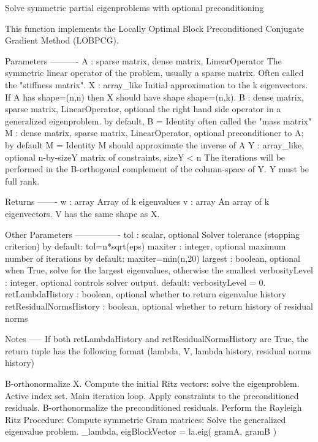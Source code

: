 \begin{DoxyVerb}Solve symmetric partial eigenproblems with optional preconditioning

This function implements the Locally Optimal Block Preconditioned
Conjugate Gradient Method (LOBPCG).

Parameters
----------
A : {sparse matrix, dense matrix, LinearOperator}
    The symmetric linear operator of the problem, usually a
    sparse matrix.  Often called the "stiffness matrix".
X : array_like
    Initial approximation to the k eigenvectors. If A has
    shape=(n,n) then X should have shape shape=(n,k).
B : {dense matrix, sparse matrix, LinearOperator}, optional
    the right hand side operator in a generalized eigenproblem.
    by default, B = Identity
    often called the "mass matrix"
M : {dense matrix, sparse matrix, LinearOperator}, optional
    preconditioner to A; by default M = Identity
    M should approximate the inverse of A
Y : array_like, optional
    n-by-sizeY matrix of constraints, sizeY < n
    The iterations will be performed in the B-orthogonal complement
    of the column-space of Y. Y must be full rank.

Returns
-------
w : array
    Array of k eigenvalues
v : array
    An array of k eigenvectors.  V has the same shape as X.

Other Parameters
----------------
tol : scalar, optional
    Solver tolerance (stopping criterion)
    by default: tol=n*sqrt(eps)
maxiter : integer, optional
    maximum number of iterations
    by default: maxiter=min(n,20)
largest : boolean, optional
    when True, solve for the largest eigenvalues, otherwise the smallest
verbosityLevel : integer, optional
    controls solver output.  default: verbosityLevel = 0.
retLambdaHistory : boolean, optional
    whether to return eigenvalue history
retResidualNormsHistory : boolean, optional
    whether to return history of residual norms


Notes
-----
If both retLambdaHistory and retResidualNormsHistory are True, the
return tuple has the following format
(lambda, V, lambda history, residual norms history)\end{DoxyVerb}
 B-\/orthonormalize X. Compute the initial Ritz vectors\+: solve the eigenproblem. Active index set. Main iteration loop. Apply constraints to the preconditioned residuals. B-\/orthonormalize the preconditioned residuals. Perform the Rayleigh Ritz Procedure\+: Compute symmetric Gram matrices\+: Solve the generalized eigenvalue problem. \+\_\+lambda, eig\+Block\+Vector = la.\+eig( gram\+A, gram\+B ) \hypertarget{namespacescipy_1_1sparse_1_1linalg_1_1eigen_1_1lobpcg_1_1lobpcg_a0647bc0e18f1bdbb0ce836d3c0128c27}{}

